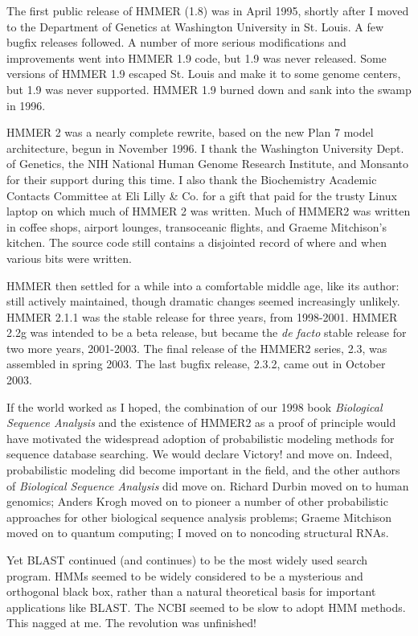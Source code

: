 The first public release of HMMER (1.8) was in April 1995, shortly
after I moved to the Department of Genetics at Washington University
in St. Louis. A few bugfix releases followed. A number of more serious
modifications and improvements went into HMMER 1.9 code, but 1.9 was
never released. Some versions of HMMER 1.9 escaped St. Louis and make
it to some genome centers, but 1.9 was never supported. HMMER 1.9
burned down and sank into the swamp in 1996.

HMMER 2 was a nearly complete rewrite, based on the new Plan 7 model
architecture, begun in November 1996. I thank the Washington
University Dept. of Genetics, the NIH National Human Genome Research
Institute, and Monsanto for their support during this time.  I also
thank the Biochemistry Academic Contacts Committee at Eli Lilly \&
Co. for a gift that paid for the trusty Linux laptop on which much of
HMMER 2 was written. Much of HMMER2 was written in coffee shops,
airport lounges, transoceanic flights, and Graeme Mitchison's
kitchen. The source code still contains a disjointed record of where
and when various bits were written.

HMMER then settled for a while into a comfortable middle age, like its
author: still actively maintained, though dramatic changes seemed
increasingly unlikely. HMMER 2.1.1 was the stable release for three
years, from 1998-2001.  HMMER 2.2g was intended to be a beta release,
but became the \emph{de facto} stable release for two more years,
2001-2003. The final release of the HMMER2 series, 2.3, was assembled
in spring 2003.  The last bugfix release, 2.3.2, came out in October
2003.

If the world worked as I hoped, the combination of our 1998 book
\emph{Biological Sequence Analysis} and the existence of HMMER2 as a
proof of principle would have motivated the widespread adoption of
probabilistic modeling methods for sequence database searching. We
would declare Victory! and move on. Indeed, probabilistic modeling did
become important in the field, and the other authors of
\emph{Biological Sequence Analysis} did move on.  Richard Durbin moved
on to human genomics; Anders Krogh moved on to pioneer a number of
other probabilistic approaches for other biological sequence analysis
problems; Graeme Mitchison moved on to quantum computing; I moved on
to noncoding structural RNAs.

Yet BLAST continued (and continues) to be the most widely used search
program. HMMs seemed to be widely considered to be a mysterious and
orthogonal black box, rather than a natural theoretical basis for
important applications like BLAST. The NCBI seemed to be slow to adopt
HMM methods. This nagged at me. The revolution was unfinished!

